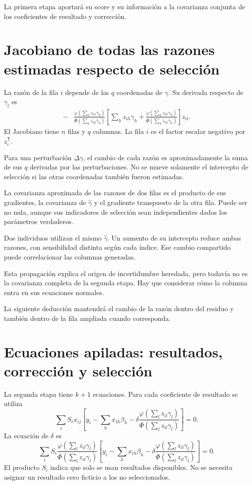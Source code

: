 \documentclass[11pt,a4paper]{article}
\newcommand{\T}{^{\mathsf T}}
\begin{document}
La primera etapa aportará
su score y su información
a la covarianza conjunta
de los coeficientes de
resultado y corrección.

\clearpage
\section{Jacobiano de todas las razones estimadas respecto de selección}\label{unidad134}
La razón de la fila \(i\)
depende de las \(q\)
coordenadas de \(\gamma\).
Su derivada respecto de \(\gamma_l\) es
\[
\begin{aligned}
-&\frac{\varphi(\sum_hz_{ih}\gamma_h)}
{\Phi(\sum_hz_{ih}\gamma_h)}
\left[
\sum_hz_{ih}\gamma_h+
\frac{\varphi(\sum_hz_{ih}\gamma_h)}
{\Phi(\sum_hz_{ih}\gamma_h)}
\right]z_{il}.
\end{aligned}
\]
El Jacobiano tiene \(n\) filas
y \(q\) columnas.
La fila \(i\) es el
factor escalar negativo por \(z_i\T\).

Para una perturbación \(\Delta\gamma\),
el cambio de cada razón
es aproximadamente la suma
de sus \(q\) derivadas
por las perturbaciones.
No se mueve solamente
el intercepto de selección
si las otras coordenadas
también fueron estimadas.

La covarianza aproximada de
las razones de dos filas
es el producto de sus
gradientes, la covarianza
de \(\widehat\gamma\) y
el gradiente transpuesto
de la otra fila.
Puede ser no nula,
aunque sus indicadores de
selección sean independientes
dados los parámetros verdaderos.

\begin{ejemplo}
Dos individuos utilizan el
mismo \(\widehat\gamma\).
Un aumento de su intercepto
reduce ambas razones,
con sensibilidad distinta
según cada índice.
Ese cambio compartido puede
correlacionar las columnas generadas.
\end{ejemplo}
Esta propagación explica el
origen de incertidumbre heredada,
pero todavía no es la
covarianza completa de la
segunda etapa.
Hay que considerar cómo
la columna entra en
sus ecuaciones normales.

La siguiente deducción mantendrá
el cambio de la razón
dentro del residuo y
también dentro de la
fila ampliada cuando corresponda.

\clearpage
\section{Ecuaciones apiladas: resultados, corrección y selección}\label{unidad135}
La segunda etapa tiene \(k+1\)
ecuaciones. Para cada coeficiente
de resultado se utiliza
\[
\sum_i S_i x_{ij}\left[
y_i-\sum_hx_{ih}\beta_h
-\delta\frac{\varphi(\sum_lz_{il}\gamma_l)}
{\Phi(\sum_lz_{il}\gamma_l)}\right]=0.
\]
La ecuación de \(\delta\) es
\[
\sum_i S_i
\frac{\varphi(\sum_lz_{il}\gamma_l)}
{\Phi(\sum_lz_{il}\gamma_l)}
\left[
y_i-\sum_hx_{ih}\beta_h
-\delta\frac{\varphi(\sum_lz_{il}\gamma_l)}
{\Phi(\sum_lz_{il}\gamma_l)}\right]=0.
\]
El producto \(S_i\) indica que
solo se usan resultados disponibles.
No se necesita asignar
un resultado cero ficticio
a los no seleccionados.
\end{document}
